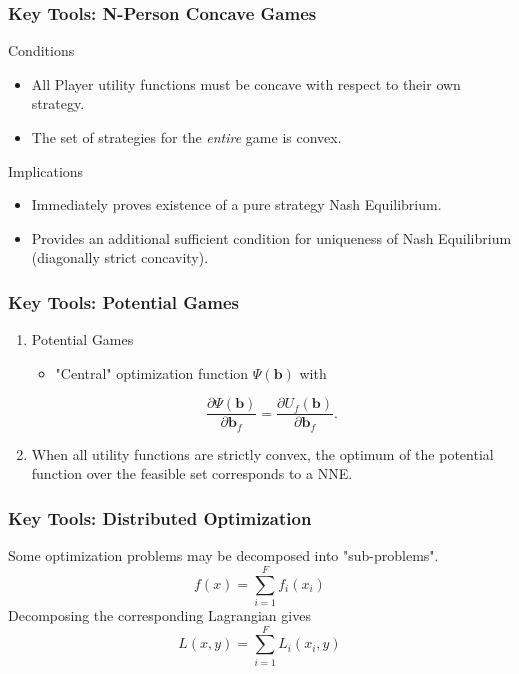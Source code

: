 \documentclass[10pt,tgadventor, onlymath]{beamer}
\begin{document}
\begin{frame}
\frametitle{Key Tools: N-Person Concave Games}
Conditions
\begin{itemize}
\item All Player utility functions must be concave with respect to their own strategy.
\item The set of strategies for the \emph{entire} game is convex. 
\end{itemize}
\bigskip
Implications
\begin{itemize}
\item Immediately proves existence of a pure strategy Nash Equilibrium.
\item Provides an additional sufficient condition for uniqueness of Nash Equilibrium (diagonally strict concavity).
\end{itemize}
\end{frame}


\begin{frame}
\frametitle{Key Tools: Potential Games}
\begin{enumerate}
\item 
Potential Games
\begin{itemize}
\item "Central" optimization function $\Psi(\mathbf{b})$ with
\end{itemize}
\begin{equation}\label{potential_game_condition}
\frac{\partial \Psi(\mathbf{b})}{\partial \mathbf{b}_{f}}
 =
 \frac{\partial U_f(\mathbf{b})}{\partial \mathbf{b}_{f}}.
\end{equation} 
\item 
When all utility functions are strictly convex, the optimum of the potential function over the feasible set corresponds to a NNE.
\end{enumerate}
\end{frame}

\begin{frame}
\frametitle{Key Tools: Distributed Optimization}
Some optimization problems may be decomposed into "sub-problems".
\begin{equation}
f(x) = \sum_{i = 1}^{F} f_{i}(x_{i})
\end{equation}
Decomposing the corresponding Lagrangian gives
\begin{equation}
L(x,y) = \sum_{i = 1}^{F} L_i(x_i,y)
\end{equation}
\end{frame}
%
\end{document}
